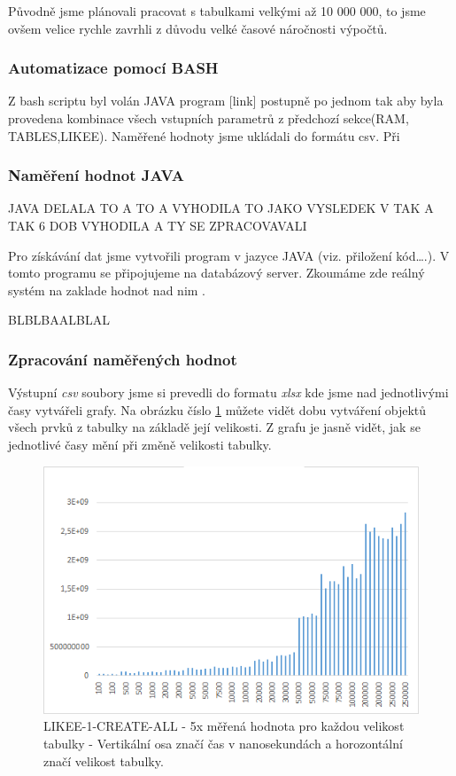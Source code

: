 \documentclass[a4paper, 11pt]{article}
\begin{document}
Původně jsme plánovali pracovat s tabulkami velkými až 10 000 000, to jsme ovšem velice rychle zavrhli z důvodu velké časové náročnosti výpočtů.

\subsubsection{Automatizace pomocí BASH}
Z bash scriptu byl volán JAVA program [link] postupně po jednom tak aby byla provedena kombinace všech vstupních parametrů z předchozí sekce(RAM, TABLES,LIKEE). Naměřené hodnoty jsme ukládali do formátu csv. Při 
\subsubsection{Naměření hodnot JAVA}
JAVA DELALA TO A TO A VYHODILA TO JAKO VYSLEDEK V TAK A TAK 6 DOB VYHODILA A TY SE ZPRACOVAVALI

Pro získávání dat jsme vytvořili program v jazyce JAVA (viz. přiložení kód….). V tomto programu se připojujeme na databázový server. Zkoumáme zde reálný  systém na zaklade hodnot nad nim .

BLBLBAALBLAL
 
\subsubsection{Zpracování naměřených hodnot}
Výstupní \textit{csv} soubory jsme si prevedli do formatu \textit{xlsx} kde jsme nad jednotlivými časy vytvářeli grafy. Na obrázku číslo \ref{sec:obr1} můžete vidět dobu vytváření objektů všech prvků z tabulky na základě její velikosti. Z grafu je jasně vidět, jak se jednotlivé časy mění při změně velikosti tabulky. 


\begin{figure}[H]
\centering
\includegraphics[width=150mm]{images/LIKEE-1-CREATE-ALL.png}
\caption{LIKEE-1-CREATE-ALL - 5x měřená hodnota pro každou velikost tabulky - Vertikální osa značí čas v nanosekundách a horozontální značí velikost tabulky.}
\label{sec:obr1}
\end{figure}
\end{document}
